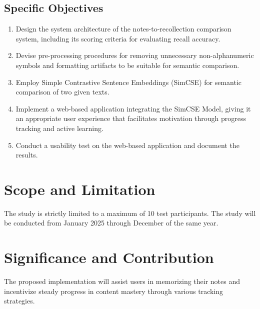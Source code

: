 \subsection{Specific Objectives}
\begin{enumerate}
    \item Design the system architecture of the notes-to-recollection comparison system, including its scoring criteria for evaluating recall accuracy.
    \item Devise pre-processing procedures for removing unnecessary non-alphanumeric symbols and formatting artifacts to be suitable for semantic comparison.
    \item Employ Simple Contrastive Sentence Embeddings (SimCSE) for semantic comparison of two given texts.
    \item Implement a web-based application integrating the SimCSE Model, giving it an appropriate user experience that facilitates motivation through progress tracking and active learning.
    \item Conduct a usability test on the web-based application and document the results.
\end{enumerate}

\section{Scope and Limitation}
The study is strictly limited to a maximum of 10 test participants. The study will be conducted from January 2025 through December of the same year.

\section{Significance and Contribution}
The proposed implementation will assist users in memorizing their notes and incentivize steady progress in content mastery through various tracking strategies.

